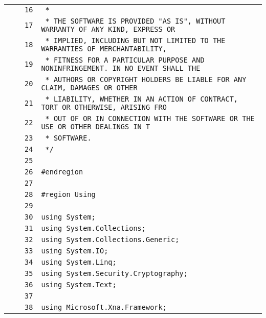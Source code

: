 \documentclass[a4paper,10pt]{article}
\begin{document}
\begin{longtable}[l]{lrrl}
\cellcolor{gray} &  & \verb~16~ & \verb~ *~\\
\cellcolor{gray} &  & \verb~17~ & \verb~ * THE SOFTWARE IS PROVIDED "AS IS", WITHOUT WARRANTY OF ANY KIND, EXPRESS OR~\\
\cellcolor{gray} &  & \verb~18~ & \verb~ * IMPLIED, INCLUDING BUT NOT LIMITED TO THE WARRANTIES OF MERCHANTABILITY,~\\
\cellcolor{gray} &  & \verb~19~ & \verb~ * FITNESS FOR A PARTICULAR PURPOSE AND NONINFRINGEMENT. IN NO EVENT SHALL THE~\\
\cellcolor{gray} &  & \verb~20~ & \verb~ * AUTHORS OR COPYRIGHT HOLDERS BE LIABLE FOR ANY CLAIM, DAMAGES OR OTHER~\\
\cellcolor{gray} &  & \verb~21~ & \verb~ * LIABILITY, WHETHER IN AN ACTION OF CONTRACT, TORT OR OTHERWISE, ARISING FRO~\\
\cellcolor{gray} &  & \verb~22~ & \verb~ * OUT OF OR IN CONNECTION WITH THE SOFTWARE OR THE USE OR OTHER DEALINGS IN T~\\
\cellcolor{gray} &  & \verb~23~ & \verb~ * SOFTWARE.~\\
\cellcolor{gray} &  & \verb~24~ & \verb~ */~\\
\cellcolor{gray} &  & \verb~25~ & \verb~~\\
\cellcolor{gray} &  & \verb~26~ & \verb~#endregion~\\
\cellcolor{gray} &  & \verb~27~ & \verb~~\\
\cellcolor{gray} &  & \verb~28~ & \verb~#region Using~\\
\cellcolor{gray} &  & \verb~29~ & \verb~~\\
\cellcolor{gray} &  & \verb~30~ & \verb~using System;~\\
\cellcolor{gray} &  & \verb~31~ & \verb~using System.Collections;~\\
\cellcolor{gray} &  & \verb~32~ & \verb~using System.Collections.Generic;~\\
\cellcolor{gray} &  & \verb~33~ & \verb~using System.IO;~\\
\cellcolor{gray} &  & \verb~34~ & \verb~using System.Linq;~\\
\cellcolor{gray} &  & \verb~35~ & \verb~using System.Security.Cryptography;~\\
\cellcolor{gray} &  & \verb~36~ & \verb~using System.Text;~\\
\cellcolor{gray} &  & \verb~37~ & \verb~~\\
\cellcolor{gray} &  & \verb~38~ & \verb~using Microsoft.Xna.Framework;~\\

\end{longtable}
\end{document}
